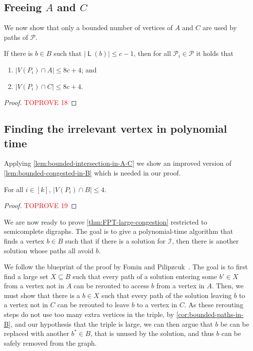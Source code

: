 \documentclass[a4paper,UKenglish,cleveref, autoref, thm-restate]{lipics-v2021}
\DeclareMathOperator{\List}{\mathsf L}
\begin{document}
\subsection{Freeing $A$ and $C$}
\label{sec:free_ac}

We now show that only a bounded number of vertices of $A$ and $C$ are used by paths of
$\mathcal{P}$.
\begin{lemma}\label{lem:bounded-intersection-in-A-C}
  If there is $b \in B$ such that $|\List(b)| \leq c-1$, then for all $\mathcal{P}_i \in
  \mathcal{P}$ it holds that
  \begin{enumerate}
    \item $|V(P_i) \cap A| \leq 8c+4$; and
    \item $|V(P_i) \cap C| \leq 8c+4$.
  \end{enumerate}
\end{lemma}
\begin{proof}\textcolor{red}{TOPROVE 18}\end{proof}


\subsection{Finding the irrelevant vertex in polynomial time}
\label{sec:finding-irrelevant-vertex}
Applying \autoref{lem:bounded-intersection-in-A-C} we show an improved version of \autoref{lem:bounded-congested-in-B} which is needed in our proof.

\begin{corollary}\label{cor:bounded-paths-in-B}
For all $i \in [k]$, $|V(P_i) \cap B| \leq 4$.
\end{corollary}
\begin{proof}\textcolor{red}{TOPROVE 19}\end{proof}



We are now ready to prove \autoref{thm:FPT-large-congestion} restricted to semicomplete digraphs.
The goal is to give a polynomial-time algorithm that finds a vertex $b \in B$ such that if there is a solution for $\mathcal{I}$, then there is another solution whose paths all avoid $b$.

We follow the blueprint of the proof by Fomin and Pilipzcuk~\cite[Theorem 9.1]{FOMIN201978}.
The goal is to first find a large set $X \subseteq B$ such that every path of a solution entering some $b' \in X$ from a vertex not in $A$  can be rerouted to access $b$ from a vertex in $A$.
Then, we must show that there is a $b \in X$ such that every path of the solution leaving $b$ to a vertex not in $C$ can be rerouted to leave $b$ to a vertex in $C$.
As these rerouting steps do not use too many extra vertices in the triple, by \autoref{cor:bounded-paths-in-B}, and our hypothesis that the triple is large, we can then argue that $b$ be can be replaced with another $b^* \in B$, that is unused by the solution, and thus $b$ can be safely removed from the graph.
\end{document}
